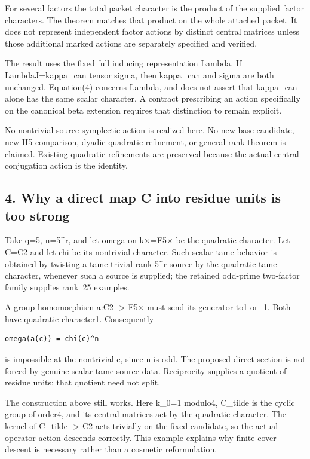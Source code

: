 For several factors the total packet character is the product of the
supplied factor characters. The theorem matches that product on the
whole attached packet. It does not represent independent factor actions
by distinct central matrices unless those additional marked actions are
separately specified and verified.

The result uses the fixed full inducing representation Lambda. If
Lambda\textbar J=kappa\_can tensor sigma, then kappa\_can and sigma are
both unchanged. Equation(4) concerns Lambda, and does not assert that
kappa\_can alone has the same scalar character. A contract prescribing
an action specifically on the canonical beta extension requires that
distinction to remain explicit.

No nontrivial source symplectic action is realized here. No new base
candidate, new H5 comparison, dyadic quadratic refinement, or general
rank theorem is claimed. Existing quadratic refinements are preserved
because the actual central conjugation action is the identity.

\hypertarget{odd_scalar-why-a-direct-map-c-into-residue-units-is-too-strong}{%
\subsection{4. Why a direct map C into residue units is too
strong}\label{odd_scalar-why-a-direct-map-c-into-residue-units-is-too-strong}}

Take q=5, n=5\^{}r, and let omega on k×=F5× be the quadratic character.
Let C=C2 and let chi be its nontrivial character. Such scalar tame
behavior is obtained by twisting a tame-trivial rank-5\^{}r source by
the quadratic tame character, whenever such a source is supplied; the
retained odd-prime two-factor family supplies rank~25 examples.

A group homomorphism a:C2 -\textgreater{} F5× must send its generator
to1 or -1. Both have quadratic character1. Consequently

\begin{Verbatim}[fontsize=\small,breaklines=true,breakanywhere=true]
omega(a(c)) = chi(c)^n
\end{Verbatim}

is impossible at the nontrivial c, since n is odd. The proposed direct
section is not forced by genuine scalar tame source data. Reciprocity
supplies a quotient of residue units; that quotient need not split.

The construction above still works. Here k\_0=1 modulo4, C\_tilde is the
cyclic group of order4, and its central matrices act by the quadratic
character. The kernel of C\_tilde -\textgreater{} C2 acts trivially on
the fixed candidate, so the actual operator action descends correctly.
This example explains why finite-cover descent is necessary rather than
a cosmetic reformulation.

